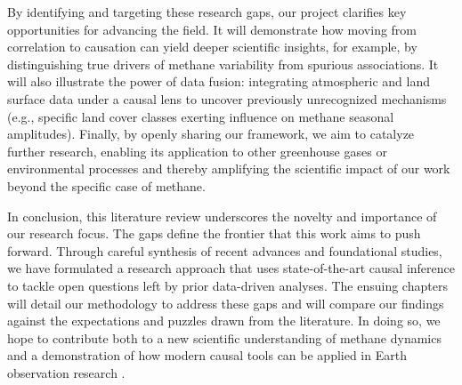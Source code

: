 \medskip

By identifying and targeting these research gaps, our project clarifies key opportunities for advancing the field. It will demonstrate how moving from correlation to causation can yield deeper scientific insights, for example, by distinguishing true drivers of methane variability from spurious associations. It will also illustrate the power of data fusion: integrating atmospheric and land surface data under a causal lens to uncover previously unrecognized mechanisms (e.g., specific land cover classes exerting influence on methane seasonal amplitudes). Finally, by openly sharing our framework, we aim to catalyze further research, enabling its application to other greenhouse gases or environmental processes and thereby amplifying the scientific impact of our work beyond the specific case of methane.

In conclusion, this literature review underscores the novelty and importance of our research focus. The gaps define the frontier that this work aims to push forward. Through careful synthesis of recent advances and foundational studies, we have formulated a research approach that uses state-of-the-art causal inference to tackle open questions left by prior data-driven analyses. The ensuing chapters will detail our methodology to address these gaps and will compare our findings against the expectations and puzzles drawn from the literature. In doing so, we hope to contribute both to a new scientific understanding of methane dynamics and a demonstration of how modern causal tools can be applied in Earth observation research \cite{Runge2019}.


